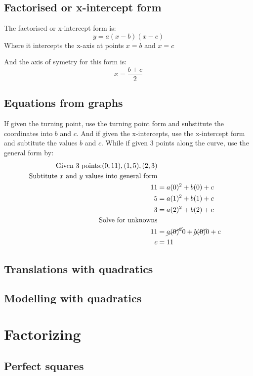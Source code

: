 \documentclass[a4paper,10pt]{report}
\begin{document}
\subsection{Factorised or x-intercept form}
The factorised or x-intercept form is:
$$
	y = a(x - b)(x - c)
$$
Where it intercepts the x-axis at points $x = b$ and $x = c$

And the axis of symetry for this form is:
$$
	x = \frac{b + c}{2}
$$

\subsection{Equations from graphs}
If given the turning point, use the turning point form and substitute the coordinates into $b$ and $c$.  And if given the x-intercepts, use the x-intercept form and subtitute the values $b$ and $c$.  While if given 3 points along the curve, use the general form by:\\
\begin{align}
	\text{Given 3 points:} (0, 11), (1, 5), (2, 3)        \\
	\text{Subtitute $x$ and $y$ values into general form} \\
	11 & = a(0)^2 + b(0) + c                              \\
	5  & = a(1)^2 + b(1) + c                              \\
	3  & = a(2)^2 + b(2) + c                              \\
	\text{Solve for unknowns}                             \\
	11 & = \cancel{a(0)^2}{0} + \cancel{b(0)}{0} + c\\
    c & = 11
\end{align}

\subsection{Translations with quadratics}

\subsection{Modelling with quadratics}

\section{Factorizing}
\subsection{Perfect squares}
\end{document}
